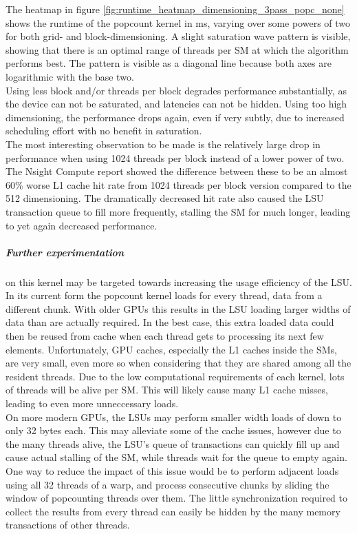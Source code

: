 \documentclass{tudscrreprt}
\begin{document}
			The heatmap in figure \ref{fig:runtime_heatmap_dimensioning_3pass_popc_none} shows the runtime of the popcount kernel in ms, varying over some powers of two for both grid- and block-dimensioning. A slight saturation wave pattern is visible, showing that there is an optimal range of threads per SM at which the algorithm performs best. The pattern is visible as a diagonal line because both axes are logarithmic with the base two. \\
			Using less block and/or threads per block degrades performance substantially, as the device can not be saturated, and latencies can not be hidden. Using too high dimensioning, the performance drops again, even if very subtly, due to increased scheduling effort with no benefit in saturation. \\
			The most interesting observation to be made is the relatively large drop in performance when using 1024 threads per block instead of a lower power of two. The Nsight Compute report showed the difference between these to be an almost 60\% worse L1 cache hit rate from 1024 threads per block version compared to the 512 dimensioning. The dramatically decreased hit rate also caused the LSU transaction queue to fill more frequently, stalling the SM for much longer, leading to yet again decreased performance. \\
			
			\subparagraph{Further experimentation} on this kernel may be targeted towards increasing the usage efficiency of the LSU. \\
			In its current form the popcount kernel loads for every thread, data from a different chunk. With older GPUs this results in the LSU loading larger widths of data than are actually required. In the best case, this extra loaded data could then be reused from cache when each thread gets to processing its next few elements. Unfortunately, GPU caches, especially the L1 caches inside the SMs, are very small, even more so when considering that they are shared among all the resident threads. Due to the low computational requirements of each kernel, lots of threads will be alive per SM. This will likely cause many L1 cache misses, leading to even more unneccessary loads. \\
			On more modern GPUs, the LSUs may perform smaller width loads of down to only 32 bytes each. This may alleviate some of the cache issues, however due to the many threads alive, the LSU's queue of transactions can quickly fill up and cause actual stalling of the SM, while threads wait for the queue to empty again. \\
			One way to reduce the impact of this issue would be to perform adjacent loads using all 32 threads of a warp, and process consecutive chunks by sliding the window of popcounting threads over them. The little synchronization required to collect the results from every thread can easily be hidden by the many memory transactions of other threads. \\
		
\end{document}
